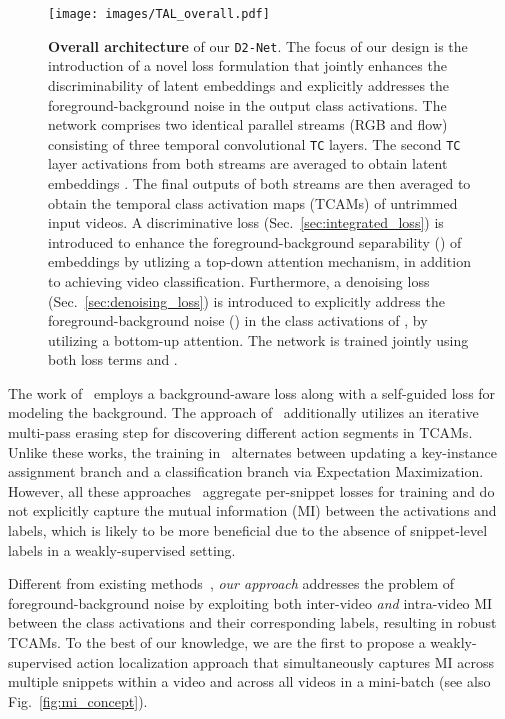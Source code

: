 \documentclass[final]{cvpr}
\def\proposed{\texttt{D2-Net}{}}
\begin{document}
\begin{figure*}[t]
    \centering
    \texttt{[image: images/TAL\_overall.pdf]}
     \vspace{-1mm}
    \caption{\textbf{Overall architecture} of our \proposed{}. The focus of our design is the introduction of a novel loss formulation that jointly enhances the discriminability of latent embeddings and explicitly addresses the foreground-background noise in the output class activations. 
The network comprises two identical parallel streams (RGB and flow) consisting of three temporal convolutional \texttt{TC} layers. The second \texttt{TC} layer activations from both streams are averaged to obtain latent embeddings . The final outputs of both streams are then averaged to obtain the temporal class activation maps (TCAMs)  of untrimmed input videos. 
A discriminative loss  (Sec.~\ref{sec:integrated_loss}) is introduced to enhance the foreground-background separability (\textcolor{blue}{}) of embeddings  by utlizing a top-down attention mechanism, 
    in addition to achieving video classification. 
    Furthermore, a denoising loss  (Sec.~\ref{sec:denoising_loss}) is introduced to explicitly address the foreground-background noise (\textcolor{red}{}) in the class activations of , by utilizing a bottom-up attention.
The network is trained jointly using both loss terms  and .\vspace{-0.27cm}
    }
    \label{fig:overall_arch}
\end{figure*}




The work of~\cite{bg-modeling} employs a background-aware loss along with a self-guided loss for modeling the background. The approach of~\cite{moniruzzaman2020action} additionally utilizes an iterative multi-pass erasing step for discovering different action segments in TCAMs.
Unlike these works, the training in~\cite{luo2020emmil} alternates between updating a key-instance assignment branch and a classification branch via Expectation Maximization.
However, all these approaches~\cite{bg-modeling,moniruzzaman2020action,luo2020emmil} aggregate per-snippet losses for training and do not explicitly capture the mutual information (MI) between the activations and labels, which is likely to be more beneficial due to the absence of snippet-level labels in a weakly-supervised setting.




Different from existing methods~\cite{bg-modeling,moniruzzaman2020action,luo2020emmil,3cnet,stpn,refineloc,dml}, \textit{our approach} addresses the problem of foreground-background noise by exploiting both inter-video \textit{and} intra-video MI between the class activations and their corresponding labels, resulting in robust TCAMs. To the best of our knowledge, we are the first to propose a weakly-supervised action localization approach that simultaneously
captures MI across multiple snippets within a video and
across all videos in a mini-batch (see also Fig.~\ref{fig:mi_concept}). 
\end{document}
